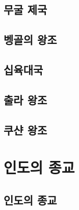 \documentclass[12pt, a4paper, oneside]{book}
\let\stdsection\section
\renewcommand\section{\newpage\stdsection}
\begin{document}
%
	\section{무굴 제국‎}

%
	\section{벵골의 왕조‎ }

%
	\section{십육대국‎}

%
	\section{출라 왕조‎}

%
	\section{쿠샨 왕조‎ }


	\chapter{인도의 종교}

%
%
%
\newpage
\section{인도의 종교}
\end{document}
